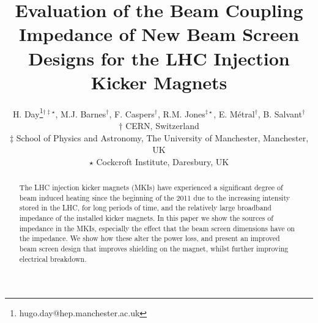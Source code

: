 \documentclass{JAC2003}
\begin{document}
\title{	Evaluation of the Beam Coupling Impedance of New Beam Screen Designs for the LHC Injection Kicker Magnets}
\author{H. Day\thanks{hugo.day@hep.manchester.ac.uk}$^{\dagger\ddagger\star}$, M.J. Barnes$^{\dagger}$, F. Caspers$^{\dagger}$, R.M. Jones$^{\ddagger \star}$, E. Métral$^{\dagger}$, B. Salvant$^{\dagger}$ \\
$\dagger$ CERN, Switzerland \\
$\ddagger$ School of Physics and Astronomy, The University of Manchester, Manchester, UK \\
$\star$ Cockcroft Institute, Daresbury, UK \\}

\maketitle

\begin{abstract}
The LHC injection kicker magnets (MKIs) have experienced a significant degree of beam induced heating since the beginning of the 2011 due to the increasing intensity stored in the LHC, for long periods of time, and the relatively large broadband impedance of the installed kicker magnets. In this paper we show the sources of impedance in the MKIs, especially the effect that the beam screen dimensions have on the impedance. We show how these alter the power loss, and present an improved beam screen design that improves shielding on the magnet, whilst further improving electrical breakdown.
\end{abstract}


%
%
%
\end{document}
